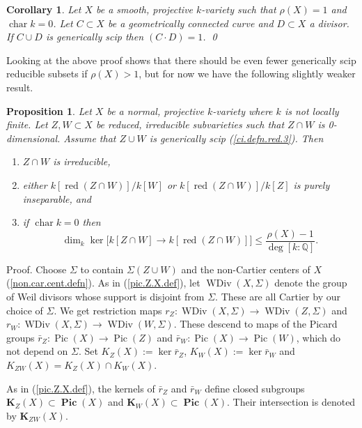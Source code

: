 \documentclass{amsart}
\newtheorem{cor}[thm]{Corollary}
\newtheorem{prop}[thm]{Proposition}
\theoremstyle{definition}
\theoremstyle{remark}
\newcommand{\q}[0]{{\mathbb Q}}
\newcommand{\pic}[0]{\operatorname{Pic}}
\newcommand{\pics}[0]{\operatorname{\mathbf{Pic}}}
\newcommand{\red}[0]{\operatorname{red}}
\newcommand{\chr}[0]{\operatorname{char}}
\newcommand{\wdiv}[0]{\operatorname{WDiv}}
\begin{document}
\begin{cor}\label{line.hyp.pl.X.lem}   Let $X$ be a smooth, projective $k$-variety such  that $\rho(X)=1$ and $\chr k=0$.
Let $C\subset X$ be a geometrically connected curve and $D\subset X$ a divisor.
If $C\cup D$ is generically scip then $(C\cdot D)=1$. \qed
\end{cor}



Looking at the above proof shows that there should be even fewer 
generically scip reducible subsets if $\rho(X)>1$,
but for now we have the following  slightly weaker result.


\begin{prop} \label{Z.cap.W.is.general}
 Let $X$ be a normal, projective $k$-variety where  $k$ is not locally  finite.
 Let $Z,W\subset X$ be reduced, irreducible subvarieties such  that  $Z\cap W$ is 0-dimensional. Assume that  $Z\cup W$ is generically scip (\ref{ci.defn.red.3}). Then
\begin{enumerate}
\item  $Z\cap W$ is irreducible,
\item either $k[\red(Z\cap W)]/k[W]$ or  $k[\red(Z\cap W)]/k[Z]$ is purely inseparable, and
\item if $\chr k=0$  then  
$$
\dim_k \ker\bigl[k[Z\cap W]\to k[\red(Z\cap W)]\bigr]\leq \frac{\rho(X)-1}{\deg [k:\q]}.
$$
\end{enumerate}
\end{prop}


Proof.  Choose $\Sigma$ to contain $\Sigma(Z\cup W)$ and the
non-Cartier centers of $X$ (\ref{non.car.cent.defn}).
As in (\ref{pic.Z.X.def}), let  
$\wdiv(X, \Sigma)$
denote the group of Weil divisors whose support is disjoint from
  $\Sigma$. These are all Cartier by our choice of $\Sigma$.
We get restriction maps
$r_Z:\wdiv(X, \Sigma)\to \wdiv(Z, \Sigma)$ and $r_W: \wdiv(X, \Sigma)\to \wdiv(W, \Sigma)$. 
These  descend to maps of the Picard groups
$\bar r_Z: \pic(X)\to \pic(Z)$ and  $ \bar r_W: \pic(X)\to \pic(W)$, which do not depend on $\Sigma$.
Set  $K_Z(X):=\ker \bar r_Z$, $K_W(X):= \ker  \bar r_W$ and
$K_{ZW}(X)=K_Z(X)\cap K_W(X)$.

As in  (\ref{pic.Z.X.def}),
the kernels of $\bar r_Z$ and $\bar r_W$ define  closed subgroups 
$ {\mathbf K}_Z(X)\subset \pics(X)$  and
$ {\mathbf K}_W(X)\subset \pics(X)$.  
Their intersection is denoted by $ {\mathbf K}_{ZW}(X)$.
\end{document}
